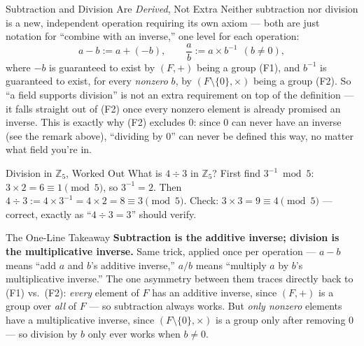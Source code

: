\begin{defbox}{Subtraction and Division Are \emph{Derived}, Not Extra}
Neither subtraction nor division is a new, independent operation requiring its own axiom --- both are just notation for ``combine with an inverse,'' one level for each operation:
$$
a - b := a + (-b), \qquad \frac{a}{b} := a \times b^{-1} \ \ (b \ne 0),
$$
where $-b$ is guaranteed to exist by $(F,+)$ being a group (F1), and $b^{-1}$ is guaranteed to exist, for every \emph{nonzero} $b$, by $(F\setminus\{0\},\times)$ being a group (F2). So ``a field supports division'' is not an extra requirement on top of the definition --- it falls straight out of (F2) once every nonzero element is already promised an inverse. This is exactly why (F2) excludes $0$: since $0$ can never have an inverse (see the remark above), ``dividing by $0$'' can never be defined this way, no matter what field you're in.
\end{defbox}

\begin{exbox}{Division in $\mathbb{Z}_5$, Worked Out}
What is $4 \div 3$ in $\mathbb{Z}_5$? First find $3^{-1} \bmod 5$: $3 \times 2 = 6 \equiv 1 \pmod 5$, so $3^{-1} = 2$. Then $4 \div 3 := 4 \times 3^{-1} = 4 \times 2 = 8 \equiv 3 \pmod 5$. Check: $3 \times 3 = 9 \equiv 4 \pmod 5$ --- correct, exactly as ``$4 \div 3 = 3$'' should verify.
\end{exbox}

\begin{rmkbox}{The One-Line Takeaway}
\textbf{Subtraction is the additive inverse; division is the multiplicative inverse.} Same trick, applied once per operation --- $a-b$ means ``add $a$ and $b$'s additive inverse,'' $a/b$ means ``multiply $a$ by $b$'s multiplicative inverse.'' The one asymmetry between them traces directly back to (F1) vs.\ (F2): \emph{every} element of $F$ has an additive inverse, since $(F,+)$ is a group over \emph{all} of $F$ --- so subtraction always works. But \emph{only nonzero} elements have a multiplicative inverse, since $(F\setminus\{0\},\times)$ is a group only after removing $0$ --- so division by $b$ only ever works when $b \ne 0$.
\end{rmkbox}

